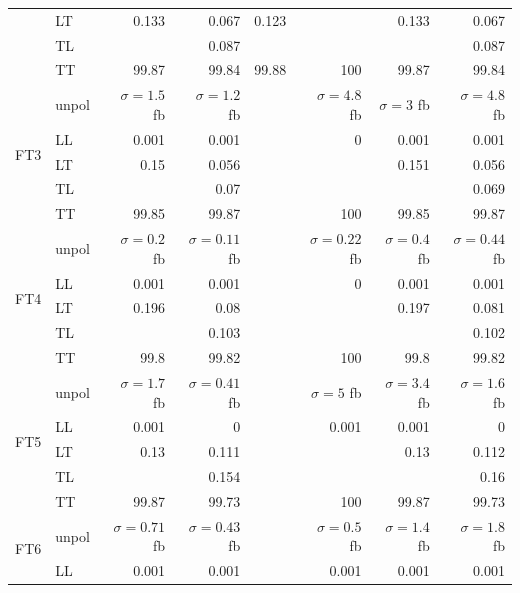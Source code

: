\begin{table}[h]
{\begin{tabular}{llrrrrrr}
 & LT & \num{0.133} & \num{0.067} & \num{0.123} &  & \num{0.133} & \num{0.067} \\
 & TL &  & \num{0.087} &  &  &  & \num{0.087} \\
 & TT & \num{99.87} & \num{99.84} & \num{99.88} & \num{100} & \num{99.87} & \num{99.84} \\
\midrule
\multirow{5}{*}{FT3}
 & unpol & $\sigma = \num{1.5}$ fb & $\sigma = \num{1.2}$ fb &  & $\sigma = \num{4.8}$ fb & $\sigma = \num{3}$ fb & $\sigma = \num{4.8}$ fb \\
 & LL & \num{0.001} & \num{0.001} &  & \num{0} & \num{0.001} & \num{0.001} \\
 & LT & \num{0.15} & \num{0.056} &  &  & \num{0.151} & \num{0.056} \\
 & TL &  & \num{0.07} &  &  &  & \num{0.069} \\
 & TT & \num{99.85} & \num{99.87} &  & \num{100} & \num{99.85} & \num{99.87} \\
\midrule
\multirow{5}{*}{FT4}
 & unpol & $\sigma = \num{0.2}$ fb & $\sigma = \num{0.11}$ fb &  & $\sigma = \num{0.22}$ fb & $\sigma = \num{0.4}$ fb & $\sigma = \num{0.44}$ fb \\
 & LL & \num{0.001} & \num{0.001} &  & \num{0} & \num{0.001} & \num{0.001} \\
 & LT & \num{0.196} & \num{0.08} &  &  & \num{0.197} & \num{0.081} \\
 & TL &  & \num{0.103} &  &  &  & \num{0.102} \\
 & TT & \num{99.8} & \num{99.82} &  & \num{100} & \num{99.8} & \num{99.82} \\
\midrule
\multirow{5}{*}{FT5}
 & unpol & $\sigma = \num{1.7}$ fb & $\sigma = \num{0.41}$ fb &  & $\sigma = \num{5}$ fb & $\sigma = \num{3.4}$ fb & $\sigma = \num{1.6}$ fb \\
 & LL & \num{0.001} & \num{0} &  & \num{0.001} & \num{0.001} & \num{0} \\
 & LT & \num{0.13} & \num{0.111} &  &  & \num{0.13} & \num{0.112} \\
 & TL &  & \num{0.154} &  &  &  & \num{0.16} \\
 & TT & \num{99.87} & \num{99.73} &  & \num{100} & \num{99.87} & \num{99.73} \\
\midrule
\multirow{5}{*}{FT6}
 & unpol & $\sigma = \num{0.71}$ fb & $\sigma = \num{0.43}$ fb &  & $\sigma = \num{0.5}$ fb & $\sigma = \num{1.4}$ fb & $\sigma = \num{1.8}$ fb \\
 & LL & \num{0.001} & \num{0.001} &  & \num{0.001} & \num{0.001} & \num{0.001} \\

\end{tabular}}
\end{table}
